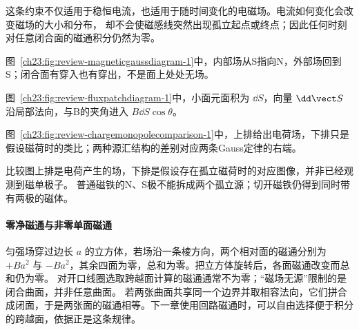 这条约束不仅适用于稳恒电流，也适用于随时间变化的电磁场。电流如何变化会改变磁场的大小和分布，
却不会使磁感线突然出现孤立起点或终点；因此任何时刻对任意闭合面的磁通积分仍然为零。

图~\ref{ch23:fig:review-magneticgaussdiagram-1}中，内部场从S指向N，外部场回到S；闭合面有穿入也有穿出，不是面上处处无场。
\par\noindent\begin{minipage}{\linewidth}
\magneticGaussDiagram
{}\label{ch23:fig:review-magneticgaussdiagram-1}
\end{minipage}\par\medskip
图~\ref{ch23:fig:review-fluxpatchdiagram-1}中，小面元面积为 $\dd S$，向量 $\dd\vect S$ 沿局部法向，与B的夹角进入 $B\dd S\cos\theta$。
\par\noindent\begin{minipage}{\linewidth}
\fluxPatchDiagram
{}\label{ch23:fig:review-fluxpatchdiagram-1}
\end{minipage}\par\medskip
图~\ref{ch23:fig:review-chargemonopolecomparison-1}中，上排给出电荷场，下排只是假设磁荷时的类比；两种源汇结构的差别对应两条Gauss定律的右端。
\par\noindent\begin{minipage}{\linewidth}
\chargeMonopoleComparison
{}\label{ch23:fig:review-chargemonopolecomparison-1}
\end{minipage}\par\medskip
比较图上排是电荷产生的场，下排是假设存在孤立磁荷时的对应图像，并非已经观测到磁单极子。
普通磁铁的N、S极不能拆成两个孤立源；切开磁铁仍得到同时带有两极的磁体。


\paragraph{零净磁通与非零单面磁通}
匀强场穿过边长 $a$ 的立方体，若场沿一条棱方向，两个相对面的磁通分别为 $+Ba^2$ 与 $-Ba^2$，其余四面为零，总和为零。把立方体旋转后，各面磁通改变而总和仍为零。
对开口线圈选取跨越面计算的磁通通常不为零；“磁场无源”限制的是闭合曲面，并非任意曲面。
若两张曲面共享同一个边界并取相容法向，它们拼合成闭面，于是两张面的磁通相等。下一章使用回路磁通时，可以自由选择便于积分的跨越面，依据正是这条规律。

